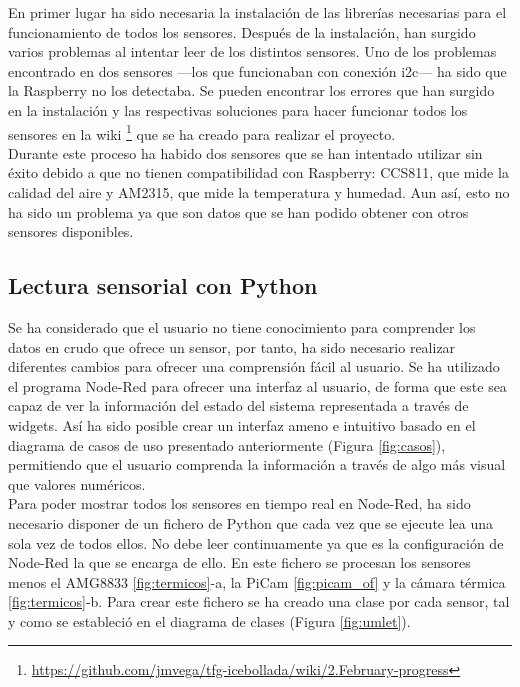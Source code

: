 En primer lugar ha sido necesaria la instalación de las librerías necesarias para el funcionamiento de todos los sensores. Después de la instalación, han surgido varios problemas al intentar leer de los distintos sensores. Uno de los problemas encontrado en dos sensores ---los que funcionaban con conexión i2c--- ha sido que la Raspberry no los detectaba. Se pueden encontrar los errores que han surgido en la instalación y las respectivas soluciones para hacer funcionar todos los sensores en la wiki \footnote{\url{https://github.com/jmvega/tfg-icebollada/wiki/2.February-progress}} que se ha creado para realizar el proyecto.\\

Durante este proceso ha habido dos sensores que se han intentado utilizar sin éxito debido a que no tienen compatibilidad con Raspberry: CCS811, que mide la calidad del aire y AM2315, que mide la temperatura y humedad. Aun así, esto no ha sido un problema ya que son datos que se han podido obtener con otros sensores disponibles.\\

\subsection{Lectura sensorial con Python}
\label{sec:ficheropython}
Se ha considerado que el usuario no tiene conocimiento para comprender los datos en crudo que ofrece un sensor, por tanto, ha sido necesario realizar diferentes cambios para ofrecer una comprensión fácil al usuario. Se ha utilizado el programa Node-Red para ofrecer una interfaz al usuario, de forma que este sea capaz de ver la información del estado del sistema representada a través de widgets. Así ha sido posible crear un interfaz ameno e intuitivo basado en el diagrama de casos de uso presentado anteriormente (Figura \ref{fig:casos}), permitiendo que el usuario comprenda la información a través de algo más visual que valores numéricos.\\

Para poder mostrar todos los sensores en tiempo real en Node-Red, ha sido necesario disponer de un fichero de Python que cada vez que se ejecute lea una sola vez de todos ellos. No debe leer continuamente ya que es la configuración de Node-Red la que se encarga de ello. En este fichero se procesan los sensores menos el AMG8833 \ref{fig:termicos}-a, la PiCam \ref{fig:picam_of} y la cámara térmica \ref{fig:termicos}-b. Para crear este fichero se ha creado una clase por cada sensor, tal y como se estableció en el diagrama de clases (Figura \ref{fig:umlet}).\\

